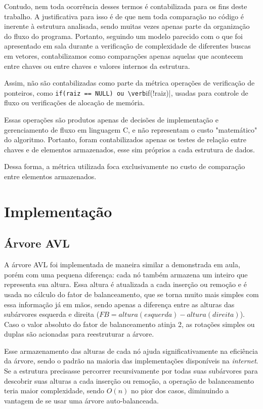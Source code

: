 \documentclass[a4paper, 12pt]{article}
\begin{document}
Contudo, nem toda ocorrência desses termos é contabilizada para os fins deste trabalho.
A justificativa para isso é de que nem toda comparação no código é inerente à estrutura
analisada, sendo muitas vezes apenas parte da organização do fluxo do programa.
Portanto, seguindo um modelo parecido com o que foi apresentado em sala durante a
verificação de complexidade de diferentes buscas em vetores, contabilizamos como
comparações apenas aquelas que acontecem entre chaves ou entre chaves e valores internos
da estrutura.

Assim, não são contabilizadas como parte da métrica operações de verificação de ponteiros,
como \verb|if(raiz == NULL) ou \verb|if(!raiz)|, usadas para controle de fluxo ou verificações
de alocação de memória.

Essas operações são produtos apenas de decisões de implementação e gerenciamento de
fluxo em linguagem C, e não representam o custo "matemático" do algoritmo. Portanto,
foram contabilizados apenas os testes de relação entre chaves e de elementos armazenados,
esse sim próprios a cada estrutura de dados.

Dessa forma, a métrica utilizada foca exclusivamente no custo de comparação entre elementos
armazenados.
\section{Implementação}

\subsection{Árvore AVL}
A árvore AVL foi implementada de maneira similar a demonstrada em aula, porém com
uma pequena diferença: cada nó também armazena um inteiro que representa sua altura.
Essa altura é atualizada a cada inserção ou remoção e é usada no cálculo do fator de
balanceamento, que se torna muito mais simples com essa informação já em mãos, sendo
apenas a diferença entre as alturas das subárvores esquerda e direita
($FB = altura(esquerda) - altura(direita)$). 
Caso o valor absoluto do fator de balanceamento atinja 2, as rotações simples ou duplas
são acionadas para reestruturar a árvore.

Esse armazenamento das alturas de cada nó ajuda significativamente na eficiência da árvore,
sendo o padrão na maioria das implementações disponíveis na \textit{internet}. Se a estrutura
precisasse percorrer recursivamente por todas suas subárvores para descobrir suas alturas a cada
inserção ou remoção, a operação de balanceamento teria maior complexidade, sendo $O(n)$ no pior
dos casos, diminuindo a vantagem de se usar uma árvore auto-balanceada.
\end{document}
